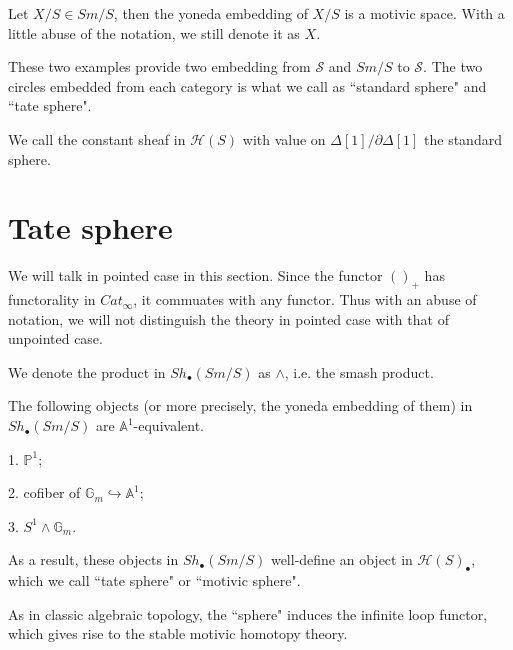 \begin{example}
    Let $X/S\in Sm/S$, then the yoneda embedding of $X/S$ is a motivic space. With a little abuse of the notation, we still denote it as $X$.
\end{example}


These two examples provide two embedding from $\mathscr{S}$ and $Sm/S$ to $\mathcal{S}$. The two circles embedded from each category is what we call as ``standard sphere" and ``tate sphere".

\begin{definition}
    We call the constant sheaf in $\mathcal{H}(S)$ with value on $\Delta[1]/\partial\Delta[1]$ the standard sphere. 
\end{definition}

\section{Tate sphere}

We will talk in pointed case in this section. Since the functor $()_+$ has functorality in $Cat_\infty$, it commuates with any functor. Thus with an abuse of notation, we will not distinguish the theory in pointed case with that of unpointed case.

\begin{remark}
    We denote the product in $Sh_{\bullet}(Sm/S)$ as $\wedge$, i.e. the smash product.
\end{remark}

\begin{proposition}
    The following objects (or more precisely, the yoneda embedding of them) in $Sh_{\bullet}(Sm/S)$ are $\mathbb{A}^1$-equivalent.

    1. $\mathbb{P}^1$;

    2. cofiber of $\mathbb{G}_m\hookrightarrow \mathbb{A}^1$;

    3. $S^1\wedge \mathbb{G}_m$.
\end{proposition}

As a result, these objects in $Sh_{\bullet}(Sm/S)$ well-define an object in $\mathcal{H}(S)_\bullet$, which we call ``tate sphere" or ``motivic sphere".
    
As in classic algebraic topology, the ``sphere" induces the infinite loop functor, which gives rise to the stable motivic homotopy theory.